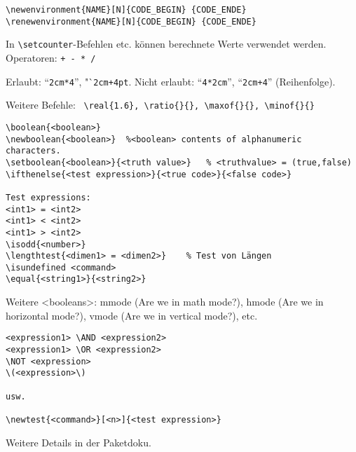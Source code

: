 \posAbstand

\negAbstand
\begin{lstlisting}
\newenvironment{NAME}[N]{CODE_BEGIN} {CODE_ENDE}
\renewenvironment{NAME}[N]{CODE_BEGIN} {CODE_ENDE}
\end{lstlisting}



\negAbstand
In \lstinline|\setcounter|-Befehlen etc. können berechnete Werte verwendet werden. Operatoren: \lstinline|+ - * /|

Erlaubt: "`\lstinline|2cm*4|"', "`\lstinline|2cm+4pt|. Nicht erlaubt: "`\lstinline|4*2cm|"', "`\lstinline|2cm+4|"' (Reihenfolge).

Weitere Befehle: \lstinline| \real{1.6}, \ratio{}{}, \maxof{}{}, \minof{}{}|

\bigskip\bigskip



\negAbstand

\begin{lstlisting}
\boolean{<boolean>}
\newboolean{<boolean>}	%<boolean> contents of alphanumeric characters.
\setboolean{<boolean>}{<truth value>}	% <truthvalue> = (true,false)
\ifthenelse{<test expression>}{<true code>}{<false code>}

Test expressions:
<int1> = <int2>
<int1> < <int2>
<int1> > <int2>
\isodd{<number>}
\lengthtest{<dimen1> = <dimen2>}	% Test von Längen
\isundefined <command>
\equal{<string1>}{<string2>}
\end{lstlisting}
%
{\small\ttfamily Weitere <booleans>: mmode (Are we in math mode?), hmode (Are we in horizontal mode?), vmode (Are we in vertical mode?), etc.
}
%
\begin{lstlisting}
<expression1> \AND <expression2>
<expression1> \OR <expression2>
\NOT <expression>
\(<expression>\)

usw.

\newtest{<command>}[<n>]{<test expression>}
\end{lstlisting}

Weitere Details in der Paketdoku.

\bigskip

